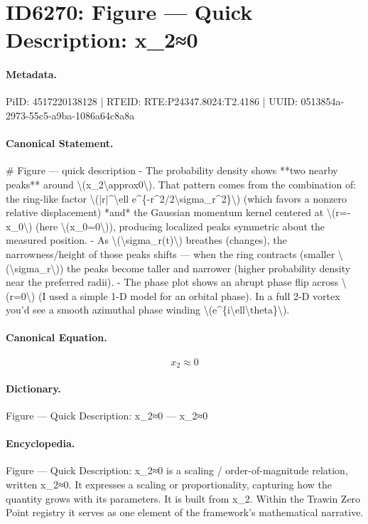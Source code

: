 \section*{ID6270: Figure — Quick Description: x\_2≈0}
\paragraph{Metadata.}
PiID: 4517220138128 | RTEID: RTE:P24347.8024:T2.4186 | UUID: 0513854a-2973-55c5-a9ba-1086a64c8a8a

\paragraph{Canonical Statement.}
\# Figure — quick description - The probability density shows **two nearby peaks** around \textbackslash{}(x\_2\textbackslash{}approx0\textbackslash{}). That pattern comes from the combination of: the ring-like factor \textbackslash{}(|r|\textasciicircum{}\textbackslash{}ell e\textasciicircum{}\{-r\textasciicircum{}2/2\textbackslash{}sigma\_r\textasciicircum{}2\}\textbackslash{}) (which favors a nonzero relative displacement) *and* the Gaussian momentum kernel centered at \textbackslash{}(r=-x\_0\textbackslash{}) (here \textbackslash{}(x\_0=0\textbackslash{})), producing localized peaks symmetric about the measured position. - As \textbackslash{}(\textbackslash{}sigma\_r(t)\textbackslash{}) breathes (changes), the narrowness/height of those peaks shifts — when the ring contracts (smaller \textbackslash{}(\textbackslash{}sigma\_r\textbackslash{})) the peaks become taller and narrower (higher probability density near the preferred radii). - The phase plot shows an abrupt phase flip across \textbackslash{}(r=0\textbackslash{}) (I used a simple 1-D model for an orbital phase). In a full 2-D vortex you’d see a smooth azimuthal phase winding \textbackslash{}(e\textasciicircum{}\{i\textbackslash{}ell\textbackslash{}theta\}\textbackslash{}).

\paragraph{Canonical Equation.}
\[
x_2\approx0
\]

\paragraph{Dictionary.}
Figure — Quick Description: x\_2≈0 — x\_2≈0

\paragraph{Encyclopedia.}
Figure — Quick Description: x\_2≈0 is a scaling / order-of-magnitude relation, written x\_2≈0. It expresses a scaling or proportionality, capturing how the quantity grows with its parameters. It is built from x\_2. Within the Trawin Zero Point registry it serves as one element of the framework's mathematical narrative.
